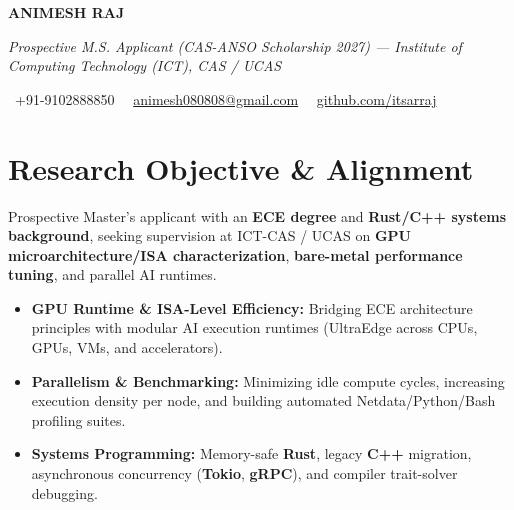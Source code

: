 \documentclass[a4paper,11pt]{article}
\newcommand{\socialicon}[1]{\raisebox{-0.05em}{\resizebox{!}{1em}{#1}}}
\newcommand{\headerfontiii}{\fontfamily{ppl}\selectfont} %
\begin{document}
\headerfontiii

\begin{center}
    {\Huge\textbf{ANIMESH RAJ}}
\end{center}
\vspace{-6mm}

\begin{center}
    {\small\textit{Prospective M.S. Applicant (CAS-ANSO Scholarship 2027) --- Institute of Computing Technology (ICT), CAS / UCAS}}
\end{center}
\vspace{-6mm}

\begin{center}
    {\small
    \socialicon{\faPhone}\ +91-9102888850 \textbar\ 
    \socialicon{\faEnvelope}\ \href{mailto:animesh080808@gmail.com}{animesh080808@gmail.com} \textbar\ 
    \socialicon{\faGithub}\ \href{https://github.com/itsarraj}{github.com/itsarraj}
    }
\end{center}
\vspace{-4mm}

\section{\textbf{Research Objective \& Alignment}}
\vspace{1mm}
{\small
Prospective Master's applicant with an \textbf{ECE degree} and \textbf{Rust/C++ systems background}, seeking supervision at ICT-CAS / UCAS on \textbf{GPU microarchitecture/ISA characterization}, \textbf{bare-metal performance tuning}, and parallel AI runtimes.
\begin{itemize}[leftmargin=3ex, itemsep=0.4mm, topsep=1mm]
    \item \textbf{GPU Runtime \& ISA-Level Efficiency:} Bridging ECE architecture principles with modular AI execution runtimes (UltraEdge across CPUs, GPUs, VMs, and accelerators).
    \item \textbf{Parallelism \& Benchmarking:} Minimizing idle compute cycles, increasing execution density per node, and building automated Netdata/Python/Bash profiling suites.
    \item \textbf{Systems Programming:} Memory-safe \textbf{Rust}, legacy \textbf{C++} migration, asynchronous concurrency (\textbf{Tokio}, \textbf{gRPC}), and compiler trait-solver debugging.
\end{itemize}
}
\vspace{-3mm}
\end{document}
